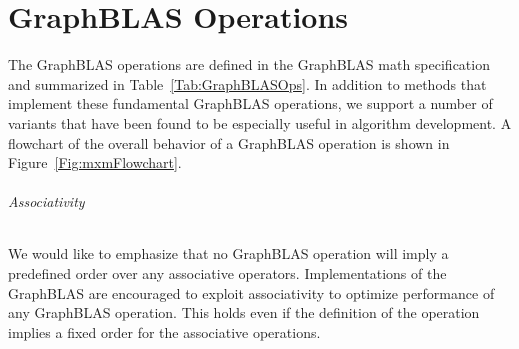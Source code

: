 \chapter{GraphBLAS Operations}
\label{Sec:Operations}

The GraphBLAS operations are defined in the GraphBLAS math specification and summarized in 
Table~\ref{Tab:GraphBLASOps}.   In addition to methods that implement these
fundamental GraphBLAS operations, we support a number of variants that have been 
found to be especially useful in algorithm development.
A flowchart of the overall behavior of a GraphBLAS operation is shown 
in Figure~\ref{Fig:mxmFlowchart}.

\subparagraph{Associativity} 
We would like to emphasize that no GraphBLAS operation will imply a predefined order over any associative operators. Implementations of the GraphBLAS are encouraged to exploit associativity to optimize performance of any GraphBLAS operation. This holds even if the definition of the operation implies a fixed order for the associative operations.


